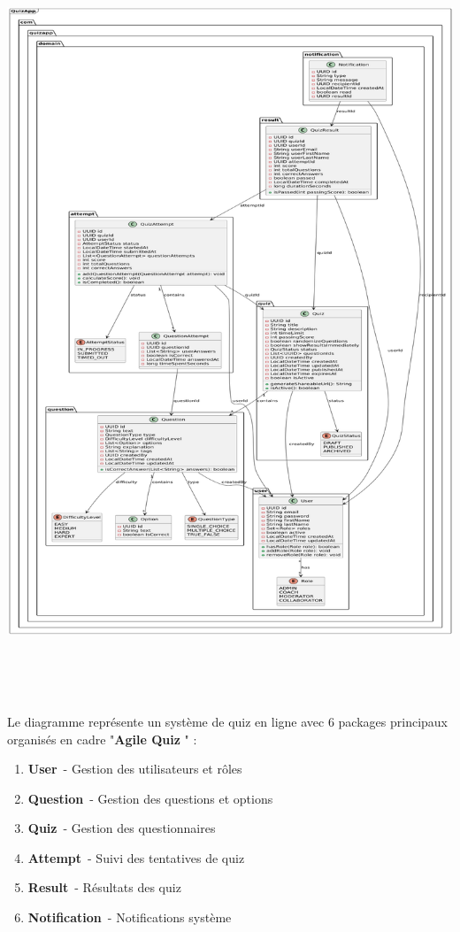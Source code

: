 \documentclass[12pt,a4paper,twoside]{report}
\begin{document}
\includegraphics[width=6.3in,height=8.85764in]{latex_media/media/image16.png}

Le diagramme représente un système de quiz en ligne avec 6 packages
principaux organisés en cadre "\textbf{Agile Quiz} " :

\begin{enumerate}
\def\labelenumi{\arabic{enumi}.}
\item
  \textbf{User}~- Gestion des utilisateurs et rôles
\item
  \textbf{Question}~- Gestion des questions et options
\item
  \textbf{Quiz}~- Gestion des questionnaires
\item
  \textbf{Attempt}~- Suivi des tentatives de quiz
\item
  \textbf{Result}~- Résultats des quiz
\item
  \textbf{Notification}~- Notifications système
\end{enumerate}
\end{document}

